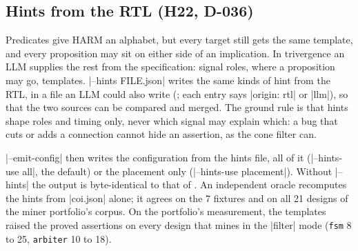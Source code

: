 \subsection{Hints from the RTL (H22, D-036)}\label{sec:hints}
Predicates give HARM an alphabet, but every target still gets the same template, and every proposition may sit on either side of an implication. In trivergence an LLM supplies the rest from the specification: signal roles, where a proposition may go, templates. \code|--hints FILE.json| writes the same kinds of hint from the RTL, in a file an LLM could also write (; each entry says \code|origin: rtl| or \code|llm|), so that the two sources can be compared and merged. The ground rule is that hints shape roles and timing only, never which signal may explain which: a bug that cuts or adds a connection cannot hide an assertion, as the cone filter can.
\code|--emit-config| then writes the configuration from the hints file, all of it (\code|--hints-use all|, the default) or the placement only (\code|--hints-use placement|). Without \code|--hints| the output is byte-identical to that of . An independent oracle recomputes the hints from \code|coi.json| alone; it agrees on the 7 fixtures and on all 21 designs of the miner portfolio's corpus. On the portfolio's measurement, the templates raised the proved assertions on every design that mines in the \code|filter| mode (\texttt{fsm} 8 to 25, \texttt{arbiter} 10 to 18).

